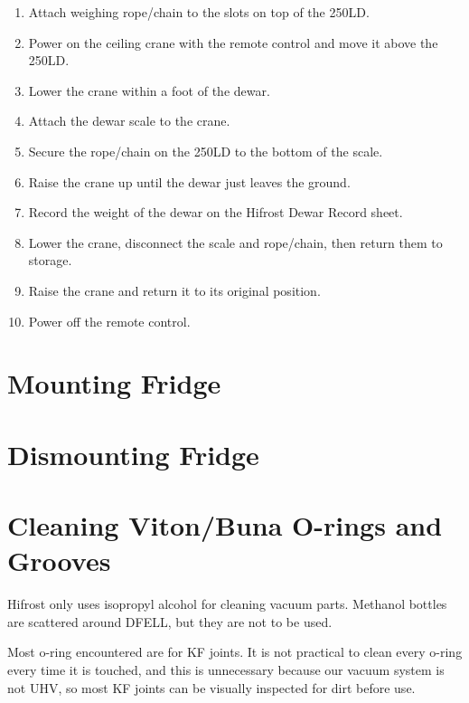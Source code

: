 \begin{enumerate}
 \item Attach weighing rope/chain to the slots on top of the 250LD.
 \item Power on the ceiling crane with the remote control and move it above the 250LD.
 \item Lower the crane within a foot of the dewar.
 \item Attach the dewar scale to the crane.
 \item Secure the rope/chain on the 250LD to the bottom of the scale.
 \item Raise the crane up until the dewar just leaves the ground.
 \item Record the weight of the dewar on the Hifrost Dewar Record sheet.
 \item Lower the crane, disconnect the scale and rope/chain, then return them to storage.
 \item Raise the crane and return it to its original position.
 \item Power off the remote control.
\end{enumerate}

\section{Mounting Fridge}

\section{Dismounting Fridge}

\section{Cleaning Viton/Buna O-rings and Grooves}
\label{cleaning-orings}

Hifrost only uses isopropyl alcohol for cleaning vacuum parts.  Methanol bottles are scattered around DFELL, but they are not to be used.

Most o-ring encountered are for KF joints.  It is not practical to clean every o-ring every time it is touched, and this is unnecessary because our vacuum system is not UHV, so most KF joints can be visually inspected for dirt before use.



